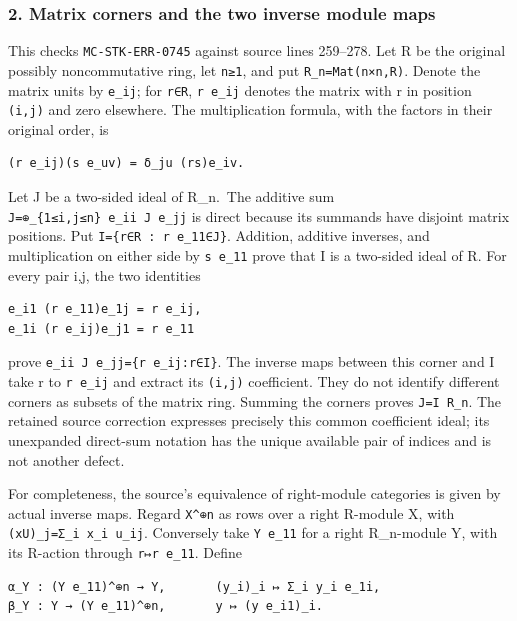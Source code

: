 \subsubsection{2. Matrix corners and the two inverse module maps}\label{matrix-corners-and-the-two-inverse-module-maps}

This checks \texttt{MC-STK-ERR-0745} against source lines 259--278. Let R be the original possibly noncommutative ring, let \texttt{n≥1}, and put \texttt{R\_n=Mat(n×n,R)}. Denote the matrix units by \texttt{e\_ij}; for \texttt{r∈R}, \texttt{r\ e\_ij} denotes the matrix with r in position \texttt{(i,j)} and zero elsewhere. The multiplication formula, with the factors in their original order, is

\begin{verbatim}
(r e_ij)(s e_uv) = δ_ju (rs)e_iv.
\end{verbatim}

Let J be a two-sided ideal of R\_n.~The additive sum \texttt{J=⊕\_\{1≤i,j≤n\}\ e\_ii\ J\ e\_jj} is direct because its summands have disjoint matrix positions. Put \texttt{I=\{r∈R\ :\ r\ e\_11∈J\}}. Addition, additive inverses, and multiplication on either side by \texttt{s\ e\_11} prove that I is a two-sided ideal of R. For every pair i,j, the two identities

\begin{verbatim}
e_i1 (r e_11)e_1j = r e_ij,
e_1i (r e_ij)e_j1 = r e_11
\end{verbatim}

prove \texttt{e\_ii\ J\ e\_jj=\{r\ e\_ij:r∈I\}}. The inverse maps between this corner and I take r to \texttt{r\ e\_ij} and extract its \texttt{(i,j)} coefficient. They do not identify different corners as subsets of the matrix ring. Summing the corners proves \texttt{J=I\ R\_n}. The retained source correction expresses precisely this common coefficient ideal; its unexpanded direct-sum notation has the unique available pair of indices and is not another defect.

For completeness, the source's equivalence of right-module categories is given by actual inverse maps. Regard \texttt{X\^{}⊕n} as rows over a right R-module X, with \texttt{(xU)\_j=Σ\_i\ x\_i\ u\_ij}. Conversely take \texttt{Y\ e\_11} for a right R\_n-module Y, with its R-action through \texttt{r↦r\ e\_11}. Define

\begin{verbatim}
α_Y : (Y e_11)^⊕n → Y,       (y_i)_i ↦ Σ_i y_i e_1i,
β_Y : Y → (Y e_11)^⊕n,       y ↦ (y e_i1)_i.
\end{verbatim}

